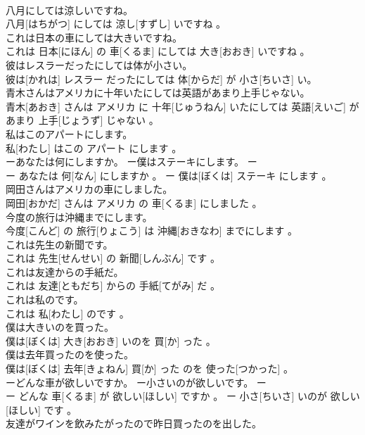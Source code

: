 \documentclass[8pt]{extreport}
\begin{document}
\begin{CJK}{UTF8}{min}
\\	八月にしては涼しいですね。	
\\	八月[はちがつ] にしては 涼し[すずし] いですね 。
\\	これは日本の車にしては大きいですね。	
\\	これは 日本[にほん] の 車[くるま] にしては 大き[おおき] いですね 。
\\	彼はレスラーだったにしては体が小さい。	
\\	彼は[かれは] レスラー だったにしては 体[からだ] が 小さ[ちいさ] い。
\\	青木さんはアメリカに十年いたにしては英語があまり上手じゃない。	
\\	青木[あおき] さんは アメリカ に 十年[じゅうねん] いたにしては 英語[えいご] が あまり 上手[じょうず] じゃない 。
\\	私はこのアパートにします。	
\\	私[わたし] はこの アパート にします 。
\\	ーあなたは何にしますか。 ー僕はステーキにします。	ー
\\	ー あなたは 何[なん] にしますか 。 ー 僕は[ぼくは] ステーキ にします 。
\\	岡田さんはアメリカの車にしました。	
\\	岡田[おかだ] さんは アメリカ の 車[くるま] にしました 。
\\	今度の旅行は沖縄までにします。	
\\	今度[こんど] の 旅行[りょこう] は 沖縄[おきなわ] までにします 。
\\	これは先生の新聞です。	
\\	これは 先生[せんせい] の 新聞[しんぶん] です 。
\\	これは友達からの手紙だ。	
\\	これは 友達[ともだち] からの 手紙[てがみ] だ 。
\\	これは私のです。	
\\	これは 私[わたし] のです 。
\\	僕は大きいのを買った。	
\\	僕は[ぼくは] 大き[おおき] いのを 買[か] った 。
\\	僕は去年買ったのを使った。	
\\	僕は[ぼくは] 去年[きょねん] 買[か] った のを 使った[つかった] 。
\\	ーどんな車が欲しいですか。 ー小さいのが欲しいです。	ー
\\	ー どんな 車[くるま] が 欲しい[ほしい] ですか 。 ー 小さ[ちいさ] いのが 欲しい[ほしい] です 。
\\	友達がワインを飲みたがったので昨日買ったのを出した。	

\end{CJK}
\end{document}
